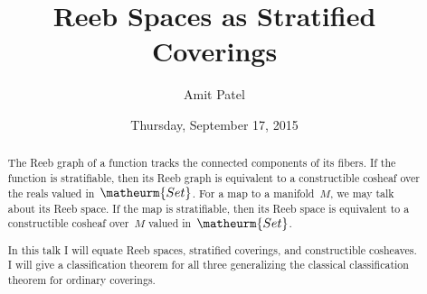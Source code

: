 \documentclass{UAmathtalk}
\author{Amit Patel}
\title{Reeb Spaces as Stratified Coverings}
\date{Thursday, September 17, 2015}
\begin{document}
\maketitle

\begin{abstract}
The Reeb graph of a function tracks the connected components of its fibers.
If the function is stratifiable, then its Reeb graph is equivalent to a constructible cosheaf over the reals valued in~$\matheurm{Set}$.
For a map to a manifold~$M$, we may talk about its Reeb space.
If the map is stratifiable, then its Reeb space is equivalent to a constructible cosheaf over~$M$ valued in~$\matheurm{Set}$.

In this talk I will equate Reeb spaces, stratified coverings, and constructible cosheaves.
I will give a classification theorem for all three generalizing the classical classification theorem for ordinary coverings.
\end{abstract}
\end{document}
